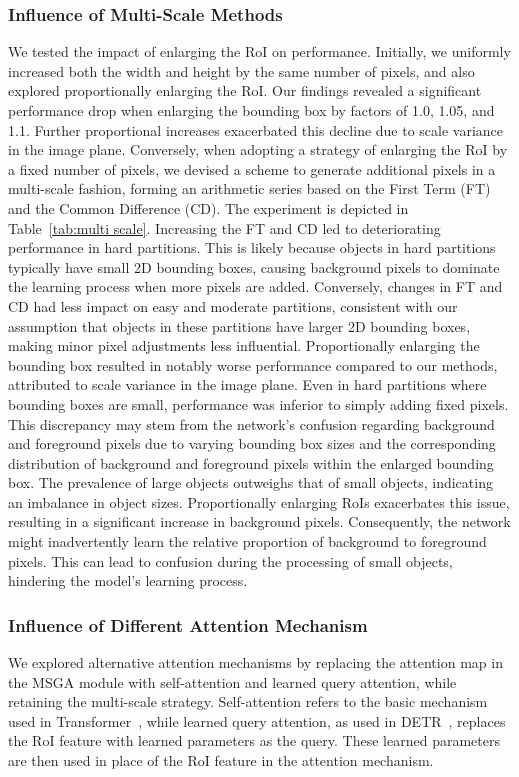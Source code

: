 \documentclass[journal]{IEEEtran}
\begin{document}
	\subsubsection{Influence of Multi-Scale Methods}
	We tested the impact of enlarging the RoI on performance. Initially, we uniformly increased both the width and height by the same number of pixels, and also explored proportionally enlarging the RoI. Our findings revealed a significant performance drop when enlarging the bounding box by factors of 1.0, 1.05, and 1.1. Further proportional increases exacerbated this decline due to scale variance in the image plane. Conversely, when adopting a strategy of enlarging the RoI by a fixed number of pixels, we devised a scheme to generate additional pixels in a multi-scale fashion, forming an arithmetic series based on the First Term (FT) and the Common Difference (CD). The experiment is depicted in Table~\ref{tab:multi scale}. Increasing the FT and CD led to deteriorating performance in hard partitions. This is likely because objects in hard partitions typically have small 2D bounding boxes, causing background pixels to dominate the learning process when more pixels are added. Conversely, changes in FT and CD had less impact on easy and moderate partitions, consistent with our assumption that objects in these partitions have larger 2D bounding boxes, making minor pixel adjustments less influential. Proportionally enlarging the bounding box resulted in notably worse performance compared to our methods, attributed to scale variance in the image plane. Even in hard partitions where bounding boxes are small, performance was inferior to simply adding fixed pixels. This discrepancy may stem from the network's confusion regarding background and foreground pixels due to varying bounding box sizes and the corresponding distribution of background and foreground pixels within the enlarged bounding box. The prevalence of large objects outweighs that of small objects, indicating an imbalance in object sizes. Proportionally enlarging RoIs exacerbates this issue, resulting in a significant increase in background pixels. Consequently, the network might inadvertently learn the relative proportion of background to foreground pixels. This can lead to confusion during the processing of small objects, hindering the model's learning process.
	
	\subsubsection{Influence of Different Attention Mechanism}
	We explored alternative attention mechanisms by replacing the attention map in the MSGA module with self-attention and learned query attention, while retaining the multi-scale strategy. Self-attention refers to the basic mechanism used in Transformer~\cite{transformer}, while learned query attention, as used in DETR~\cite{detr}, replaces the RoI feature with learned parameters as the query. These learned parameters are then used in place of the RoI feature in the attention mechanism.
	
\end{document}
